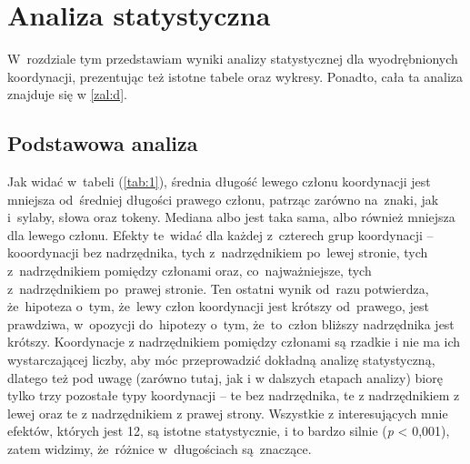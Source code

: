 \documentclass[licencjacka]{pracamgr_Kogni}
\begin{document}
    \chapter{Analiza statystyczna}\label{ch:analiza-statystyczna}
    W~rozdziale tym przedstawiam wyniki analizy statystycznej dla wyodrębnionych koordynacji, prezentując też istotne tabele oraz wykresy. Ponadto, cała ta analiza znajduje się w \ref{zal:d}.


    \section{Podstawowa analiza}\label{sec:podstawowa-analiza}
    Jak widać w~tabeli (\ref{tab:1}), średnia długość lewego członu koordynacji jest mniejsza od~średniej długości prawego członu, patrząc zarówno na~znaki, jak i~sylaby, słowa oraz tokeny.
    Mediana albo jest taka sama, albo również mniejsza dla lewego członu.
    Efekty te~widać dla każdej z~czterech grup koordynacji -- kooordynacji bez nadrzędnika, tych z~nadrzędnikiem po~lewej stronie, tych z~nadrzędnikiem pomiędzy członami oraz, co~najważniejsze, tych z~nadrzędnikiem po~prawej stronie.
    Ten ostatni wynik od~razu potwierdza, że~hipoteza o~tym, że~lewy człon koordynacji jest krótszy od~prawego, jest prawdziwa, w~opozycji do~hipotezy o~tym, że~to~człon bliższy nadrzędnika jest krótszy.
    Koordynacje z nadrzędnikiem pomiędzy członami są rzadkie i nie ma ich wystarczającej liczby, aby móc przeprowadzić dokładną analizę statystyczną, dlatego też pod uwagę (zarówno tutaj, jak i w dalszych etapach analizy) biorę tylko trzy pozostałe typy koordynacji -- te bez nadrzędnika, te z nadrzędnikiem z lewej oraz te z nadrzędnikiem z prawej strony.
    Wszystkie z interesujących mnie efektów, których jest 12, są istotne statystycznie, i to bardzo silnie (\textit{p} < 0,001), zatem widzimy, że~różnice w~długościach są~znaczące.
\end{document}
